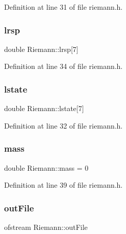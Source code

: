 Definition at line 31 of file riemann.\+h.

\mbox{\label{classRiemann_a6fa975d17342f29096d3e11402b543be}} 
\subsubsection{\texorpdfstring{lrsp}{lrsp}}
{\footnotesize\ttfamily double Riemann\+::lrsp\mbox{[}7\mbox{]}\hspace{0.3cm}{\ttfamily [private]}}



Definition at line 34 of file riemann.\+h.

\mbox{\label{classRiemann_a96f646a8bc32309955dc55b81d209d3f}} 
\subsubsection{\texorpdfstring{lstate}{lstate}}
{\footnotesize\ttfamily double Riemann\+::lstate\mbox{[}7\mbox{]}\hspace{0.3cm}{\ttfamily [private]}}



Definition at line 32 of file riemann.\+h.

\mbox{\label{classRiemann_a8997d6d8d411e369d4fd2a377335236e}} 
\subsubsection{\texorpdfstring{mass}{mass}}
{\footnotesize\ttfamily double Riemann\+::mass = 0\hspace{0.3cm}{\ttfamily [private]}}



Definition at line 39 of file riemann.\+h.

\mbox{\label{classRiemann_a9656634a42300884c7f97b4ca5bd3645}} 
\subsubsection{\texorpdfstring{out\+File}{outFile}}
{\footnotesize\ttfamily ofstream Riemann\+::out\+File\hspace{0.3cm}{\ttfamily [private]}}




